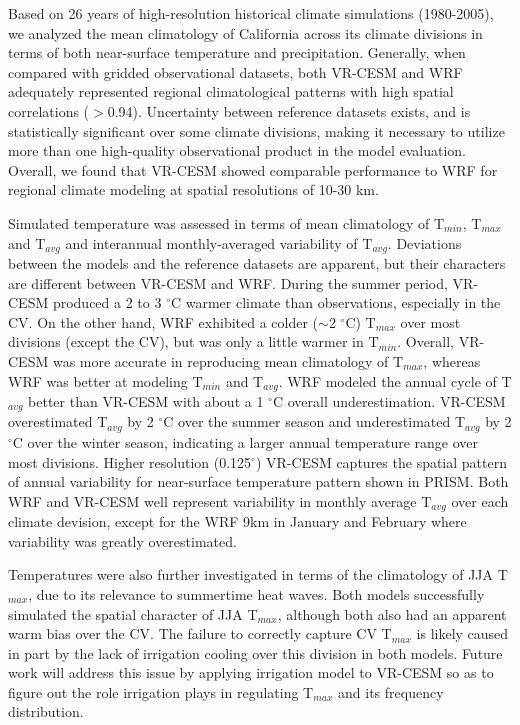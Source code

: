 \documentclass[draft,ms]{agutex}   %
\begin{document}
\begin{article}
Based on 26 years of high-resolution historical climate simulations (1980-2005), we analyzed the mean climatology of California across its climate divisions in terms of both near-surface temperature and precipitation. Generally, when compared with gridded observational datasets, both VR-CESM and WRF adequately represented regional climatological patterns with high spatial correlations ($>$0.94). Uncertainty between reference datasets exists, and is statistically significant over some climate divisions, making it necessary to utilize more than one high-quality observational product in the model evaluation. Overall, we found that VR-CESM showed comparable performance to WRF for regional climate modeling at spatial resolutions of 10-30 km.


Simulated temperature was assessed in terms of mean climatology of T$_{min}$, T$_{max}$ and T$_{avg}$ and interannual monthly-averaged variability of T$_{avg}$.  Deviations between the models and the reference datasets are apparent, but their characters are different between VR-CESM and WRF. During the summer period, VR-CESM produced a 2 to 3 $^\circ$C warmer climate than observations, especially in the CV. On the other hand, WRF exhibited a colder ($\sim$2 $^\circ$C) T$_{max}$ over most divisions (except the CV), but was only a little warmer in T$_{min}$. Overall, VR-CESM was more accurate in reproducing mean climatology of T$_{max}$, whereas WRF was better at modeling T$_{min}$ and T$_{avg}$. WRF modeled the annual cycle of T$_{avg}$ better than VR-CESM with about a 1 $^\circ$C overall underestimation. VR-CESM overestimated T$_{avg}$ by 2 $^\circ$C over the summer season and underestimated T$_{avg}$ by 2 $^\circ$C over the winter season, indicating a larger annual temperature range over most divisions. Higher resolution (0.125$^\circ$) VR-CESM captures the spatial pattern of annual variability for near-surface temperature pattern shown in PRISM. Both WRF and VR-CESM well represent variability in monthly average T$_{avg}$ over each climate devision, except for the WRF 9km in January and February where variability was greatly overestimated.


Temperatures were also further investigated in terms of the climatology of JJA T$_{max}$, due to its relevance to summertime heat waves.  Both models successfully simulated the spatial character of JJA T$_{max}$, although both also had an apparent warm bias over the CV.  The failure to correctly capture CV T$_{max}$ is likely caused in part by the lack of irrigation cooling over this division in both models. Future work will address this issue by applying irrigation model to VR-CESM so as to figure out the role irrigation plays in regulating T$_{max}$ and its frequency distribution.



\end{article}
\end{document}
